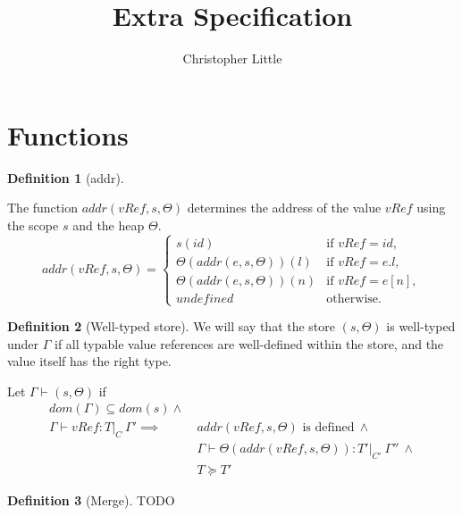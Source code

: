 \documentclass[a4paper]{article}
\theoremstyle{definition}
\newtheorem{definition}{Definition}[section]
\theoremstyle{dotless}
\begin{document}
\title{ Extra Specification }
\author{Christopher Little}
\maketitle

\section{Functions}
\begin{definition}[addr]\label{addr}

  The function $addr(vRef, s, \Theta)$ determines the address of the value $vRef$ using the scope $s$ and the heap $\Theta$.
  \begin{equation}\label{addr-eqn}
  	addr(vRef, s, \Theta) = 
  	\begin{cases}
  	  s(id)& \text{if $vRef = id$}, \\
  	  \Theta(addr(e, s, \Theta))(l) & \text{if $vRef = e.l$}, \\
  	  \Theta(addr(e, s, \Theta))(n) & \text{if $vRef = e[n]$}, \\
  	  undefined & \text{otherwise.}
  	\end{cases}
  \end{equation}
\end{definition}

\begin{definition}[Well-typed store]\label{typed-store}
  We will say that the store $(s,\Theta)$ is well-typed under $\Gamma$ if all typable value
  references are well-defined within the store, and the value itself has
  the right type.

  Let $\Gamma \vdash (s, \Theta)$ if 
  \begin{equation} \label{typed-store-eqn}
  	\begin{split}
  	  dom(\Gamma) \subseteq dom(s) \land\ & \\
  	  \Gamma \vdash vRef:T|_C\ \Gamma' \implies & addr(vRef,s, \Theta)\textrm{ is defined}\ \land \\
  	  & \Gamma\vdash\Theta(addr(vRef,s,\Theta)):T'|_{C'}\ \Gamma''\ \land \\
  	  & T \succeq T'
  	\end{split}
  \end{equation}
\end{definition}

\begin{definition}[Merge]\label{merge}
  TODO 
\end{definition}
\end{document}
